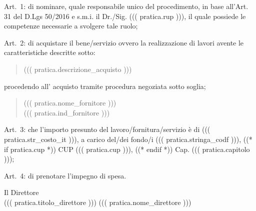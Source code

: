 \documentclass[a4paper,12pt]{letter}
\begin{document}
\begin{list}{VALUTATA}{}
\item[Art.~1:] di nominare, quale responsabile unico del procedimento, in base 
           all'Art. 31 del D.Lgs 50/2016 e s.m.i. il Dr./Sig. ((( pratica.rup ))),
           il quale possiede le competenze necessarie a svolgere tale ruolo; 
\item[Art.~2:] di acquistare il bene/servizio ovvero la realizzazione di lavori
        avente le caratteristiche descritte sotto:
\begin{quote}
            ((( pratica.descrizione_acquisto )))
\end{quote}

procedendo all' acquisto tramite procedura negoziata sotto soglia;

\begin{quote}
((( pratica.nome_fornitore )))\\
((( pratica.ind_fornitore )))
\end{quote}

\item[Art.~3:] che l'importo presunto del lavoro/fornitura/servizio è di 
((( pratica.str_costo_it ))),
a carico del/dei fondo/i ((( pratica.stringa_codf ))), ((* if pratica.cup *)) CUP ((( pratica.cup ))), ((* endif *)) Cap. ((( pratica.capitolo ))); 
\end{list}
\begin{minipage}{\linewidth}
\begin{list}{VALUTATA}{}
\item[Art.~4:] di prenotare l'impegno di spesa. 
\end{list}
\vspace{10mm}

\begin{flushright}
\begin{minipage}[t]{6cm}
\begin{center}
Il Direttore \\
((( pratica.titolo_direttore ))) ((( pratica.nome_direttore )))
\end{center}
\end{minipage}
\end{flushright}
\end{minipage}
\end{document}

